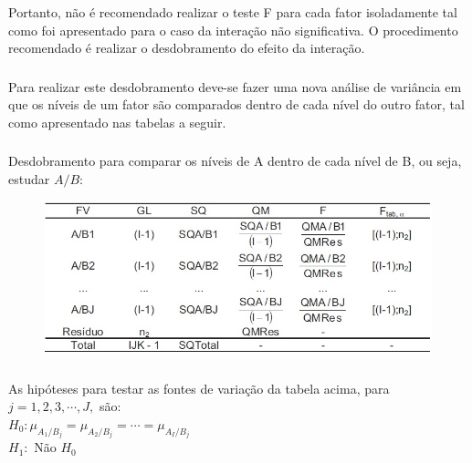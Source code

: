 \documentclass[14pt,aspectratio=1610]{beamer}
\begin{document}
\begin{frame}{}
\frametitle{}
\begin{block}{}
\justifying
Portanto, não é recomendado realizar o teste F para cada fator
isoladamente tal como foi apresentado para o caso da interação não significativa.
O procedimento recomendado é realizar o desdobramento do
efeito da interação.
\end{block}
\end{frame}

\begin{frame}{}
\frametitle{}
\begin{block}{}
\justifying
Para realizar este desdobramento deve-se fazer uma nova análise de
va\-ri\-ân\-cia em que os níveis de um fator são comparados dentro de cada nível
do outro fator, tal como apresentado nas tabelas a seguir.
\end{block}
\end{frame}

\begin{frame}{}
\frametitle{}
\begin{block}{}
\justifying
Desdobramento para comparar os níveis de A dentro de cada nível de B,
ou seja, estudar $A/B:$
\begin{figure}[H]
    \centering
    \includegraphics[scale=0.5]{Figuras/A_dentro_B}
  \end{figure}
\end{block}
\end{frame}

\begin{frame}{}
\frametitle{}
\begin{block}{}
\justifying
As hipóteses para testar as fontes de variação da tabela acima, para 
$j=1,2,3,\cdots,J,$ são:\\

$H_{0}:\mu_{A_{1}/B_{j}}=\mu_{A_{2}/B_{j}}=\cdots=\mu_{A_{I}/B_{j}}$\\
$H_{1}:$ Não $H_{0}$

\end{block}
\end{frame}
\end{document}
